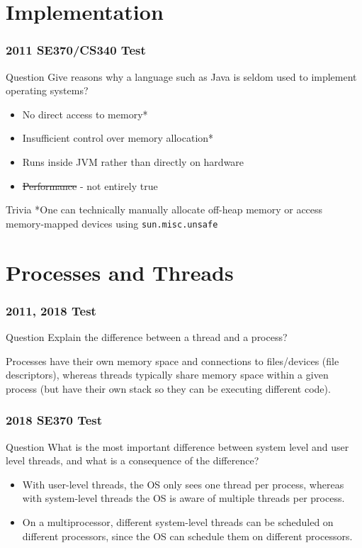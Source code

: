 \documentclass{beamer}
\begin{document}
\section{Implementation}
\begin{frame}
  \frametitle{2011 SE370/CS340 Test}
  \begin{block}{Question}
    Give reasons why a language such as Java is seldom used to implement operating systems?
  \end{block}
  \pause
  \begin{itemize}
    \item No direct access to memory*
    \item Insufficient control over memory allocation*
    \item Runs inside JVM rather than directly on hardware
    \item \sout{Performance} - not entirely true
  \end{itemize}
  \begin{exampleblock}{Trivia}
    *One can technically manually allocate off-heap memory or access memory-mapped devices using \texttt{sun.misc.unsafe}
  \end{exampleblock}
\end{frame}
\section{Processes and Threads}
\begin{frame}
  \frametitle{2011, 2018 Test}
  \begin{block}{Question}
    Explain the difference between a thread and a process?
  \end{block}
  \pause
  Processes have their own memory space and connections to files/devices (file descriptors), whereas threads typically share memory space within a given process (but have their own stack so they can be executing different code).
\end{frame}
\begin{frame}
  \frametitle{2018 SE370 Test}
  \begin{block}{Question}
    What is the most important difference between system level and user level threads, and what is a consequence of the difference?
  \end{block}
  \pause
  \begin{itemize}
    \item With user-level threads, the OS only sees one thread per process, whereas with system-level threads the OS is aware of multiple threads per process.
    \item On a multiprocessor, different system-level threads can be scheduled on different processors, since the OS can schedule them on different processors.
  \end{itemize}
\end{frame}
\end{document}
